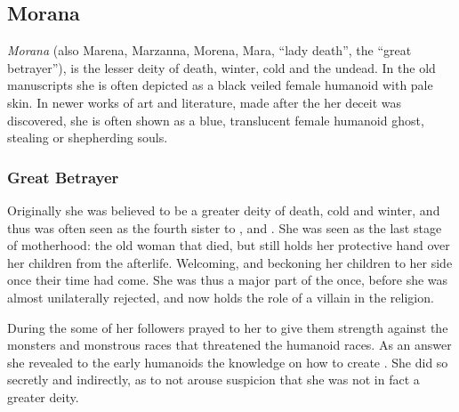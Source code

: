 \clearpage
{}
\clearpage

\subsection{Morana}
\label{sec:Morana}


\emph{Morana} (also Marena, Marzanna, Morena, Mara, ``lady death'', the
``great betrayer''), is the lesser deity of death, winter, cold and the undead.
In the old manuscripts she is often depicted as a black veiled female humanoid
with pale skin. In newer works of art and literature, made after the her
deceit was discovered, she is often shown as a blue, translucent female
humanoid ghost, stealing or shepherding souls.

\subsubsection{Great Betrayer}
\label{sec:Great Betrayer}

Originally she was believed to be a greater deity of death, cold and winter,
and thus was often seen as the fourth sister to ,
 and . She was seen as the last stage
of motherhood: the old woman that died, but still holds her protective hand
over her children from the afterlife. Welcoming, and beckoning her children to
her side once their time had come. She was thus a major part of the
 once, before she was almost unilaterally rejected, and
now holds the role of a villain in the religion.

During the  some of her followers prayed to her to
give them strength against the monsters and monstrous races that threatened
the humanoid races. As an answer she revealed to the early humanoids the
knowledge on how to create . She did so secretly and
indirectly, as to not arouse suspicion that she was not in fact a greater
deity.


